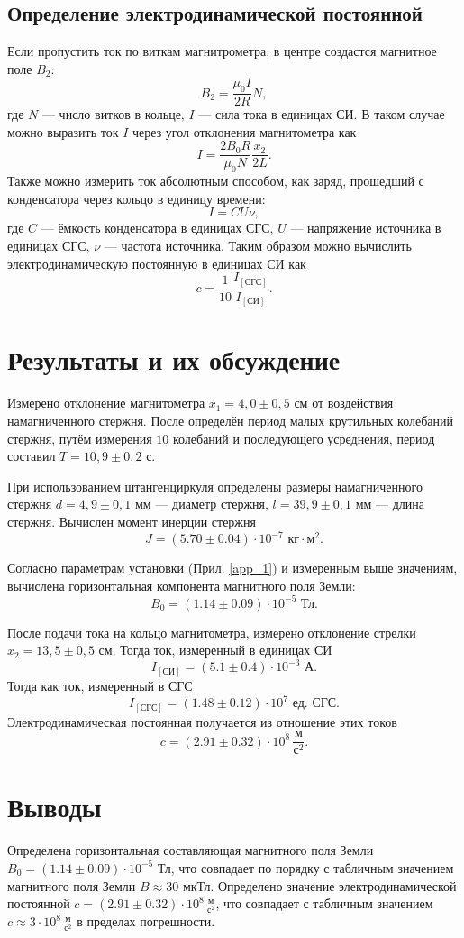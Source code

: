 \documentclass[12pt]{article}
\begin{document}
\subsection{Определение электродинамической постоянной}
Если пропустить ток по виткам магнитрометра, в центре создастся магнитное поле $B_2$:
\[
    B_2 = \frac{\mu_0 I}{2 R} N, 
\] 
где $N$ --- число витков в кольце, $I$ --- сила тока в единицах СИ.  
В таком случае можно выразить ток $I$ через угол отклонения магнитометра как 
\[
    I = \frac{2 B_0 R}{\mu_0 N} \frac{x_2}{2L}.
\] 
Также можно измерить ток абсолютным способом, как заряд, прошедший с конденсатора через кольцо в единицу времени: 
\[
    I = CU\nu,
\]
где $C$ --- ёмкость конденсатора в единицах СГС, $U$ --- напряжение источника в единицах СГС, $\nu$ --- частота источника.  
Таким образом можно вычислить электродинамическую постоянную в единицах СИ как 
\[
    c = \frac{1}{10} \frac{I_{[\textrm{СГС}]}}{I_{[\textrm{СИ}]}}.
\]

\section{Результаты и их обсуждение}

Измерено отклонение магнитометра $x_1 = 4,0 \pm 0,5$ см от воздействия намагниченного стержня. 
После определён период малых крутильных колебаний стержня, путём измерения $10$ колебаний и последующего усреднения, 
период составил $T = 10,9 \pm 0,2$ с. 

При использованием штангенциркуля определены размеры намагниченного стержня 
$d = 4,9 \pm 0,1$ мм --- диаметр стержня, $l = 39,9 \pm 0,1$ мм --- длина стержня. Вычислен момент инерции стержня
\[
    J = (5.70 \pm 0.04) \cdot 10^{-7} \textrm{ кг} \cdot \textrm{м}^2.
\]  

Согласно параметрам установки (Прил. \ref{app_1}) и измеренным выше значениям, вычислена горизонтальная компонента 
магнитного поля Земли: 
\[
    B_0 = (1.14 \pm 0.09) \cdot 10^{-5} \textrm{ Тл}. 
\]

После подачи тока на кольцо магнитометра, измерено отклонение стрелки $x_2 = 13,5 \pm 0,5$ см.  
Тогда ток, измеренный в единицах СИ
\[
    I_{[\textrm{СИ}]} = (5.1 \pm 0.4) \cdot 10^{-3} \textrm{ А}.
\]
Тогда как ток, измеренный в СГС 
\[
    I_{[\textrm{СГС}]} = (1.48 \pm 0.12) \cdot 10^7 \textrm{ ед. СГС}.
\]
Электродинамическая постоянная получается из отношение этих токов
\[
    c = (2.91 \pm 0.32) \cdot 10^8 \, \frac{\textrm{м}}{\textrm{с}^2}.
\]

\section{Выводы}
Определена горизонтальная составляющая магнитного поля Земли $B_0 = (1.14 \pm 0.09) \cdot 10^{-5} \textrm{ Тл}$, 
что совпадает по порядку с табличным значением магнитного поля Земли $B \approx 30$ мкТл. 
Определено значение электродинамической постоянной $c = (2.91 \pm 0.32) \cdot 10^8 \, \frac{\textrm{м}}{\textrm{с}^2}$, 
что совпадает с табличным значением $c \approx 3 \cdot 10^8 \, \frac{\textrm{м}}{\textrm{с}^2}$ в пределах погрешности.
\end{document}
